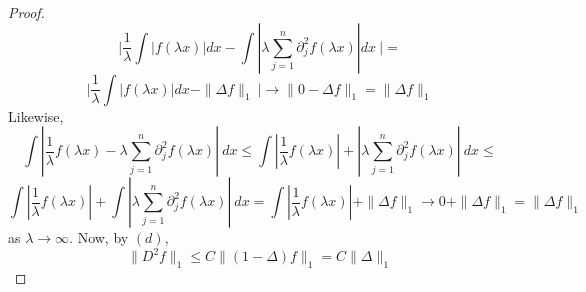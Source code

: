 \documentclass[12pt]{article}
\newenvironment{exercise}[2][Exercise]{\begin{trivlist}
\item[\hskip \labelsep {\bfseries #1}\hskip \labelsep {\bfseries #2.}]}{\end{trivlist}}
\begin{document}
\begin{proof}
$$    $$
    $$
      \Big| \frac{1}{\lambda} \int |f(\lambda x)| dx - \int |\lambda \sum_{j=1}^n \partial_j^2 f(\lambda x)| dx\ \Big| =
    $$
    $$
      \Big| \frac{1}{\lambda} \int |f(\lambda x)| dx - \|\Delta f\|_1\ \Big| \rightarrow
      \|0 - \Delta f\|_1 =
      \|\Delta f\|_1
    $$
    Likewise,
    $$
      \int |\frac{1}{\lambda} f(\lambda x) - \lambda \sum_{j=1}^n \partial_j^2 f(\lambda x)|\ dx \le
      \int |\frac{1}{\lambda} f(\lambda x)| + |\lambda \sum_{j=1}^n \partial_j^2 f(\lambda x)|\ dx \le
    $$
    $$
      \int |\frac{1}{\lambda} f(\lambda x)| + \int |\lambda \sum_{j=1}^n \partial_j^2 f(\lambda x)|\ dx =
      \int |\frac{1}{\lambda} f(\lambda x)| + \|\Delta f\|_1 \rightarrow
      0 + \|\Delta f\|_1 =
      \|\Delta f\|_1
    $$
    as $\lambda \rightarrow \infty$.
    Now, by $(d)$,
    $$
      \|D^2 f\|_1 \le
      C \|(1 - \Delta)f\|_1 =
      C \|\Delta\|_1
    $$
\end{proof}

\begin{exercise}{2}
\end{exercise}
\end{document}
